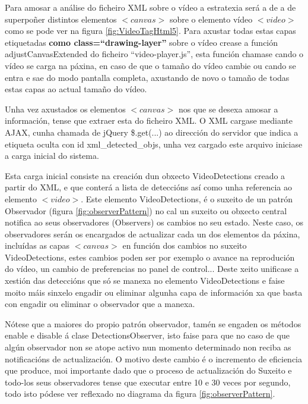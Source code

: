         Para amosar a análise do ficheiro XML sobre o vídeo a estratexia será a de a de superpoñer 
        distintos elementos $<canvas>$ sobre o elemento vídeo $<video>$ como se pode ver na figura 
        \ref{fig:VideoTagHtml5}. Para axustar todas estas capas etiquetadas 
        \textbf{como class=``drawing-layer''}
        sobre o vídeo crease a función adjustCanvasExtended do ficheiro ``video-player.js'', esta función 
        chamase cando o vídeo se carga na páxina, en caso de que o tamaño do vídeo cambie ou cando se 
        entra e sae do modo pantalla completa, axustando de novo o tamaño de todas estas capas ao actual
        tamaño do vídeo.
        
        Unha vez axustados os elementos $<canvas>$ nos que se desexa amosar a información, tense que 
        extraer esta do ficheiro XML. O XML cargase mediante AJAX, cunha chamada de jQuery \$.get(...) 
        ao dirección do servidor que indica a etiqueta oculta con id xml\_detected\_objs, unha vez cargado
        este arquivo iniciase a carga inicial do sistema.
        
        Esta carga inicial consiste na creación dun obxecto VideoDetections creado a partir do XML, e
        que conterá a lista de deteccións así como unha referencia ao elemento $<video>$. Este elemento
        VideoDetections, é o suxeito de un patrón Observador (figura \ref{fig:observerPattern})
        no cal un suxeito ou obxecto central notifica ao seus observadores (Observers) os cambios 
        no seu estado. Neste caso, os observadores serán os encargados de actualizar cada un dos
        elementos da páxina, incluídas as capas $<canvas>$ en función dos cambios no suxeito VideoDetections,
        estes cambios poden ser por exemplo o avance na reprodución do vídeo, un cambio de 
        preferencias no panel de control... Deste xeito unificase a xestión das deteccións que só
        se manexa no elemento VideoDetections e faise moito máis sinxelo engadir ou eliminar
        algunha capa de información xa que basta con engadir ou eliminar o observador que a manexa.
        
        Nótese que a maiores do propio patrón observador, tamén se engaden os métodos enable e disable á
        clase DetectionsObserver, isto faise para que no caso de que algún observador non se atope 
        activo nun momento determinado non reciba as notificacións de actualización. O motivo deste
        cambio é o incremento de eficiencia que produce, moi importante dado que o proceso de actualización
        do Suxeito e todo-los seus observadores tense que executar entre 10 e 30 veces por segundo, todo
        isto pódese ver reflexado no diagrama da figura \ref{fig:observerPattern}.
        
